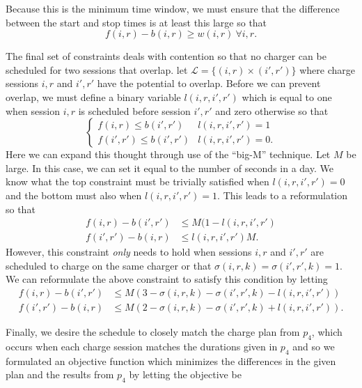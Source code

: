 \par Because this is the minimum time window, we must ensure that the difference between the start and stop times is at least this large so that
\begin{equation}\label{eqn:assignment:eqn4}
	f(i,r) - b(i,r) \ge w(i,r) \ \forall i,r.
\end{equation}
\par The final set of constraints deals with contention so that no charger can be scheduled for two sessions that overlap. let $\mathcal{L} = \{(i,r)\times (i',r') \}$ where charge sessions $i,r$ and $i',r'$ have the potential to overlap. Before we can prevent overlap, we must define a binary variable $l(i,r,i',r')$ which is equal to one when session $i,r$ is scheduled before session $i',r'$ and zero otherwise so that
\begin{equation}
	\begin{cases}
		f(i,r) \le b(i',r') & l(i,r,i',r') = 1 \\
		f(i',r') \le b(i',r') & l(i,r,i',r') = 0. 
	\end{cases}
\end{equation}
Here we can expand this thought through use of the ``big-M'' technique.  Let $M$ be large. In this case, we can set it equal to the number of seconds in a day. We know what the top constraint must be trivially satisfied when $l(i,r,i',r') = 0$ and the bottom must also when $l(i,r,i',r') = 1$.  This leads to a reformulation so that
\begin{equation*}\begin{aligned}
		f(i,r) - b(i',r') & \le M(1 - l(i,r,i',r')\\
		f(i',r') - b(i,r) & \le l(i,r,i',r')M.  
\end{aligned}\end{equation*}
However, this constraint {\it only} needs to hold when sessions $i,r$ and $i',r'$ are scheduled to charge on the same charger or that $\sigma(i,r,k) = \sigma(i',r',k) = 1$. We can reformulate the above constraint to satisfy this condition by letting
\begin{equation}\label{eqn:assignment:eqn5}\begin{aligned}
	f(i,r) - b(i',r') & \le M(3 - \sigma(i,r,k) - \sigma(i',r',k) - l(i,r,i',r')) \\
	f(i',r') - b(i,r) & \le M(2 - \sigma(i,r,k) - \sigma(i',r',k) + l(i,r,i',r')).
\end{aligned}\end{equation}
\par Finally, we desire the schedule to closely match the charge plan from $p_4$, which occurs when each charge session matches the durations given in $p_4$ and so we formulated an objective function which minimizes the differences in the given plan and the results from $p_4$ by letting the objective be
